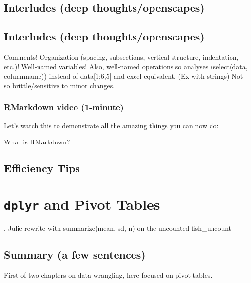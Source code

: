 \documentclass[]{book}
\begin{document}
\hypertarget{interludes-deep-thoughtsopenscapes-1}{%
\section{Interludes (deep thoughts/openscapes)}\label{interludes-deep-thoughtsopenscapes-1}}

\hypertarget{interludes-deep-thoughtsopenscapes-2}{%
\section{Interludes (deep thoughts/openscapes)}\label{interludes-deep-thoughtsopenscapes-2}}

Comments! Organization (spacing, subsections, vertical structure, indentation, etc.)! Well-named variables! Also, well-named operations so analyses (select(data, columnname)) instead of data{[}1:6,5{]} and excel equivalent. (Ex with strings)
Not so brittle/sensitive to minor changes.

\hypertarget{rmarkdown-video-1-minute}{%
\subsection{RMarkdown video (1-minute)}\label{rmarkdown-video-1-minute}}

Let's watch this to demonstrate all the amazing things you can now do:

\href{https://vimeo.com/178485416}{What is RMarkdown?}

\hypertarget{efficiency-tips-2}{%
\section{Efficiency Tips}\label{efficiency-tips-2}}

\hypertarget{pivot}{%
\chapter{\texorpdfstring{\texttt{dplyr} and Pivot Tables}{dplyr and Pivot Tables}}\label{pivot}}

. Julie rewrite with summarize(mean, sd, n) on the uncounted fish\_uncount

\hypertarget{summary-a-few-sentences-2}{%
\section{Summary (a few sentences)}\label{summary-a-few-sentences-2}}

First of two chapters on data wrangling, here focused on pivot tables.
\end{document}
